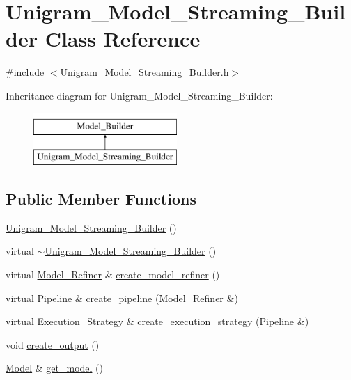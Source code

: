 \hypertarget{class_unigram___model___streaming___builder}{
\section{Unigram\_\-Model\_\-Streaming\_\-Builder Class Reference}
\label{class_unigram___model___streaming___builder}
}


{\ttfamily \#include $<$Unigram\_\-Model\_\-Streaming\_\-Builder.h$>$}

Inheritance diagram for Unigram\_\-Model\_\-Streaming\_\-Builder:\begin{figure}[H]
\begin{center}
\leavevmode
\includegraphics[height=2cm]{class_unigram___model___streaming___builder}
\end{center}
\end{figure}
\subsection*{Public Member Functions}
\begin{DoxyCompactItemize}
\item 
\hyperlink{class_unigram___model___streaming___builder_a44b21e7bd2e8cb1c60bfea440096fe7a}{Unigram\_\-Model\_\-Streaming\_\-Builder} ()
\item 
virtual \hyperlink{class_unigram___model___streaming___builder_ad0dfdc71d21460ed1d16fa3585051500}{$\sim$Unigram\_\-Model\_\-Streaming\_\-Builder} ()
\item 
virtual \hyperlink{class_model___refiner}{Model\_\-Refiner} \& \hyperlink{class_unigram___model___streaming___builder_a99deeb4b433573561f57df03c4d10bd2}{create\_\-model\_\-refiner} ()
\item 
virtual \hyperlink{class_pipeline}{Pipeline} \& \hyperlink{class_unigram___model___streaming___builder_af846cbebd1061196deaae3ec1ae7e7c2}{create\_\-pipeline} (\hyperlink{class_model___refiner}{Model\_\-Refiner} \&)
\item 
virtual \hyperlink{class_execution___strategy}{Execution\_\-Strategy} \& \hyperlink{class_unigram___model___streaming___builder_abd9759893f1f7da00cf5b4b1abc68064}{create\_\-execution\_\-strategy} (\hyperlink{class_pipeline}{Pipeline} \&)
\item 
void \hyperlink{class_unigram___model___streaming___builder_a82ebccd666a5c8f46886323a323679e6}{create\_\-output} ()
\item 
\hyperlink{class_model}{Model} \& \hyperlink{class_unigram___model___streaming___builder_a9afdd36c7ece8fa1ad87fa1b3f898d20}{get\_\-model} ()
\end{DoxyCompactItemize}
